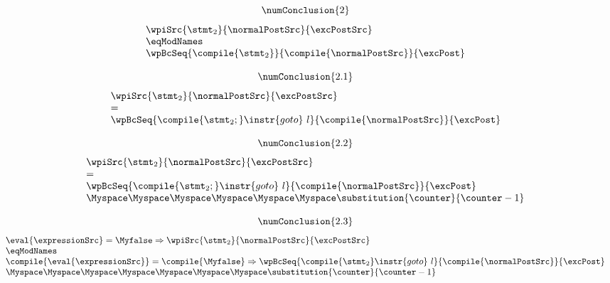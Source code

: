 \begin{pogEquiv}
\begin{description}
\begin{description}
$$\numConclusion{2} $$
$$
\begin{array}{l}
       \wpiSrc{\stmt_2 }{\normalPostSrc }{ \excPostSrc }\\ 
       \eqModNames  \\ 
       \wpBcSeq{\compile{\stmt_2} }{\compile{\normalPostSrc} }{
 \excPost }
  \end{array} $$



$$\numConclusion{2.1} $$
$$
\begin{array}{l}
       \wpiSrc{\stmt_2 }{\normalPostSrc }{ \excPostSrc }\\ 
       =  \\ 
       \wpBcSeq{\compile{\stmt_2;}\instr{ goto } \ l }{\compile{\normalPostSrc} }{ \excPost }
  \end{array} $$

 


$$\numConclusion{2.2}$$
$$\begin{array}{l}
       \wpiSrc{\stmt_2 }{\normalPostSrc }{ \excPostSrc }\\ 
       =  \\ 
       \wpBcSeq{\compile{\stmt_2;}\instr{goto} \ l }{\compile{\normalPostSrc} }{\excPost } \\
           \Myspace \Myspace  \Myspace \Myspace     \Myspace \Myspace  \substitution{\counter}{ \counter - 1}
  \end{array} $$







$$\numConclusion{2.3}$$
$$
\begin{array}{l}
     \eval{\expressionSrc } = \Myfalse \Rightarrow   \wpiSrc{\stmt_2 }{\normalPostSrc}{\excPostSrc } \\  
     \eqModNames  \\ 
      \compile{\eval{\expressionSrc }} = \compile{\Myfalse} \Rightarrow   \wpBcSeq{\compile{\stmt_2}\instr{ goto } \ l }{\compile{\normalPostSrc} }{
 \excPost } \\
\Myspace \Myspace \Myspace\Myspace \Myspace \Myspace \Myspace  \substitution{\counter}{ \counter - 1}
  \end{array} $$




\end{description}
\end{description}
\end{pogEquiv}
